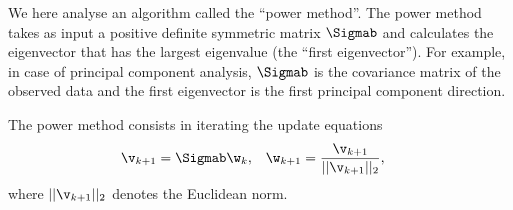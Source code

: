 

\label{ex:power-method}
We here analyse an algorithm called the ``power method''. The power method takes
as input a positive definite symmetric matrix $\Sigmab$ and calculates the
eigenvector that has the largest eigenvalue (the ``first eigenvector''). For
example, in case of principal component analysis, $\Sigmab$ is the covariance
matrix of the observed data and the first eigenvector is the first principal
component direction.

The power method consists in iterating the update equations
\begin{align}
  \v_{k+1} &= \Sigmab \w_{k}, & \w_{k+1} &= \frac{\v_{k+1}}{||\v_{k+1}||_2},
\end{align}
where $||\v_{k+1}||_2$ denotes the Euclidean norm.

